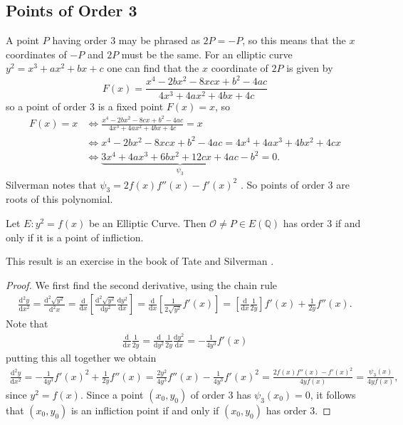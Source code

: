 \subsection{Points of Order 3}%
\label{sub:points_of_order_3}
A point $P$ having order $3$ may be phrased as $2P = -P$,
so this means that the $x$ coordinates of $-P$ and $2P$ must be the same.
For an elliptic curve $y^2 = x^3 + ax^2 + bx + c$
one can find that the $x$ coordinate of $2P$ is given by
\begin{equation} \label{eq:xcord2p}
  F(x) = \frac{x^4 -2bx^2 - 8xcx + b^2 - 4ac}{4x^3+4ax^2 + 4bx+4c}
\end{equation}
so a point of order 3 is a fixed point $F(x) = x$, so
\begin{align*}
  F(x) = x &\iff \frac{x^4 -2bx^2 -8cx + b^2 - 4ac}{4x^3+4ax^2 + 4bx+4c} = x \\
           &\iff x^4 -2bx^2 -8xcx + b^2 - 4ac = 4x^4+4ax^3 + 4bx^2+4cx \\
           &\iff \underbrace{3x^{4} + 4ax^3 + 6bx^2 + 12 cx + 4ac - b^2}_{\psi_3} = 0.
\end{align*}
Silverman notes that $\psi_3 = 2f(x)f''(x) - f'(x)^2$ \cite[section 2.1]{silvermanRationalPoints}.
So points of order 3 are roots of this polynomial.
\begin{theorem}
  Let $E: y^2 = f(x)$ be an Elliptic Curve.
  Then $\mathcal{O} \neq P \in E(\mathbb{Q})$ has order 3
  if and only if it is a point of infliction.
\end{theorem}
This result is an exercise in the book of Tate and Silverman
\cite[Exercise 2.2]{silvermanRationalPoints}.
\begin{proof}
  We first find the second derivative, using the chain rule
  \begin{align*}
    \frac{\mathrm{d}^2y}{\mathrm{d}x^2} = \frac{\mathrm{d}^2 \sqrt{y^2} }{\mathrm{d}^2 x}
    = \frac{\mathrm{d}}{\mathrm{d}x} \left[ \frac{\mathrm{d}^2 \sqrt{y^2} }{\mathrm{d}y^2} \frac{\mathrm{d}y^2}{\mathrm{d}x}   \right]
    = \frac{\mathrm{d}}{\mathrm{d}x} \left[ \frac{1}{2 \sqrt{y^2}} f'(x)   \right]
    = \left[\frac{\mathrm{d}}{\mathrm{d}x}\frac{1}{2y} \right] f'(x)
    + \frac{1}{2y} f''(x).
  \end{align*}
  Note that
  \begin{align*}
    \frac{\mathrm{d}}{\mathrm{d}x} \frac{1}{2y} = \frac{\mathrm{d}}{\mathrm{d}y^2} \frac{1}{2y} \frac{\mathrm{d}y^2}{\mathrm{d}x}
    = -\frac{1}{4 y^3} f'(x)
  \end{align*}
  putting this all together we obtain
  \begin{align*}
    \frac{\mathrm{d}^2y}{\mathrm{d}x^2} = -\frac{1}{4y^3} f'(x)^2 + \frac{1}{2y} f''(x)
    = \frac{2y^2}{4y^3} f''(x) - \frac{1}{4y^3}f'(x)^2
    = \frac{2f(x)f''(x) - f'(x)^2}{4yf(x)}
    = \frac{\psi_3(x)}{4y f(x)},
  \end{align*}
  since $y^2 = f(x)$.
  Since a point $(x_0, y_0)$ of order 3 has $\psi_3(x_0) = 0$,
  it follows that $(x_0, y_0)$ is an infliction point
  if and only if $(x_0, y_0)$ has order 3.
\end{proof}
